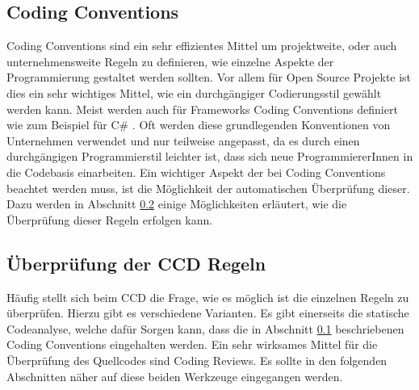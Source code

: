 \subsection{Coding Conventions}
\label{cha:CodingConventions}
Coding Conventions sind ein sehr effizientes Mittel um projektweite, oder auch unternehmensweite Regeln zu definieren, wie einzelne Aspekte der Programmierung gestaltet werden sollten. Vor allem für Open Source Projekte ist dies ein sehr wichtiges Mittel, wie ein durchgängiger Codierungsstil gewählt werden kann. Meist werden auch für Frameworks Coding Conventions definiert wie zum Beispiel für C\# \cite{Microsoft2016}. Oft werden diese grundlegenden Konventionen von Unternehmen verwendet und nur teilweise angepasst, da es durch einen durchgängigen Programmierstil leichter ist, dass sich neue ProgrammiererInnen in die Codebasis einarbeiten. Ein wichtiger Aspekt der bei Coding Conventions beachtet werden muss, ist die Möglichkeit der automatischen Überprüfung dieser. Dazu werden in Abschnitt \ref{cha:CheckingCCDCriterias} einige Möglichkeiten erläutert, wie die Überprüfung dieser Regeln erfolgen kann.

 
\subsection{Überprüfung der CCD Regeln}
\label{cha:CheckingCCDCriterias}
Häufig stellt sich beim CCD die Frage, wie es möglich ist die einzelnen Regeln zu überprüfen. Hierzu gibt es verschiedene Varianten. Es gibt einerseits die statische Codeanalyse, welche dafür Sorgen kann, dass die in Abschnitt \ref{cha:CodingConventions} beschriebenen Coding Conventions eingehalten werden. Ein sehr wirksames Mittel für die Überprüfung des Quellcodes sind Coding Reviews. Es sollte in den folgenden Abschnitten näher auf diese beiden Werkzeuge eingegangen werden.

